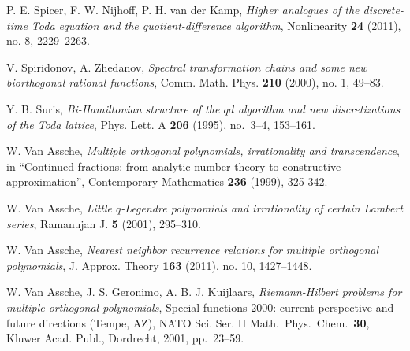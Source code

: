 \documentclass{amsart}
\theoremstyle{remark}
\numberwithin{equation}{section}
\begin{document}
\begin{thebibliography}{99}
P. E. Spicer, F. W. Nijhoff, P. H. van der Kamp,
\textit{Higher analogues of the discrete-time Toda equation and the quotient-difference algorithm},
Nonlinearity \textbf{24} (2011), no. 8, 2229--2263.

V. Spiridonov, A. Zhedanov, 
\textit{Spectral transformation chains and some new biorthogonal rational functions}, 
Comm. Math. Phys. \textbf{210} (2000), no. 1, 49--83.

Y. B. Suris, 
\textit{Bi-Hamiltonian structure of the $qd$ algorithm and new discretizations of the Toda lattice},
Phys. Lett. A \textbf{206} (1995), no.~3--4, 153--161.

 W. Van Assche, 
\textit{Multiple orthogonal polynomials, irrationality and  transcendence}, 
in ``Continued fractions: from analytic number theory to constructive approximation'',
Contemporary Mathematics \textbf{236} (1999), 325-342.

W. Van Assche,
\textit{ Little $q$-Legendre polynomials and irrationality of certain Lambert series}, 
Ramanujan J. \textbf{5} (2001), 295--310.

W. Van Assche, 
\textit{Nearest neighbor recurrence relations for multiple orthogonal polynomials},
J. Approx. Theory \textbf{163} (2011), no. 10, 1427--1448.

W. Van Assche, J. S. Geronimo, A. B. J. Kuijlaars,
\textit{Riemann-Hilbert problems for multiple orthogonal polynomials},
Special functions 2000: current perspective and future directions (Tempe, AZ),
NATO Sci. Ser. II Math.\ Phys.\ Chem.\ \textbf{30}, Kluwer Acad. Publ., Dordrecht, 2001, pp.~23--59.
\end{thebibliography}
\end{document}
